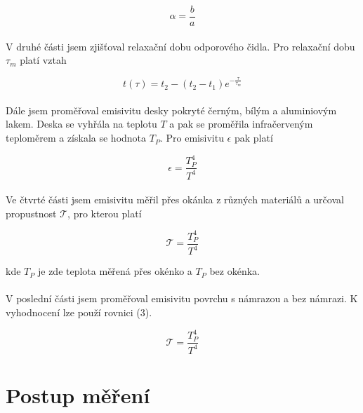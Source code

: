 \documentclass[a4paper,11pt]{article}
\newcommand{\Tau}{\mathcal{T}}
\begin{document}
    \begin{equation}
        \alpha = \frac{b}{a}
    \end{equation}

    \paragraph{} V druhé části jsem zjišťoval relaxační dobu odporového čidla.
    Pro relaxační dobu $\tau_{m}$ platí vztah

    \begin{equation}
        t(\tau) = t_{2} - (t_{2} - t_{1}) e^{- \frac{\tau}{\tau_{m}}}
    \end{equation}

    \paragraph{} Dále jsem proměřoval emisivitu desky pokryté černým, bílým
    a aluminiovým lakem. Deska se vyhřála na teplotu $T$ a pak se proměřila
    infračerveným teploměrem a získala se hodnota $T_{P}$. Pro emisivitu 
    $\epsilon$ pak platí

    \begin{equation}
        \epsilon = \frac{T_{P}^{4}}{T^{4}}
    \end{equation}

    \paragraph{} Ve čtvrté části jsem emisivitu měřil přes okánka z různých
    materiálů a určoval propustnost $\Tau$, pro kterou platí 

    \begin{equation}
        \Tau = \frac{T_{P}^{4}}{T^{4}}
    \end{equation}

    kde $T_{P}$ je zde teplota měřená přes okénko a $T_{P}$ bez okénka.

    \paragraph{} V poslední části jsem proměřoval emisivitu povrchu s námrazou
    a bez námrazi. K vyhodnocení lze použí rovnici (3).

    \begin{equation}
        \Tau = \frac{T_{P}^{4}}{T^{4}}
    \end{equation}
    
\section{Postup měření}
\end{document}
